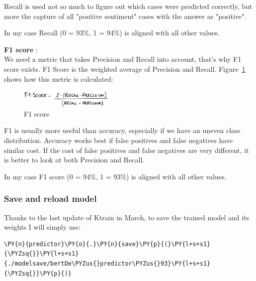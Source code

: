 Recall is used not so much to figure out which cases were predicted correctly, but more the capture of all "positive sentiment" cases with the answer as "positive".

In my case Recall (0 = 93\%, 1 = 94\%) is aligned with all other values.

\textbf{F1 score} \cite{brownlee_how_2020}:\\
We need a metric that takes Precision and Recall into account, that's why F1 score exists.
F1 Score is the weighted average of Precision and Recall.
Figure~\ref{fig:fig_f1} shows how this metric is calculated:
\begin{figure}[ht!]
\centering
\includegraphics[width=0.4\textwidth]{images/f1.png}
\caption{F1 score}
\label{fig:fig_f1}
\end{figure}
\FloatBarrier

F1 is usually more useful than accuracy, especially if we have an uneven class distribution. Accuracy works best if false positives and false negatives have similar cost. If the cost of false positives and false negatives are very different, it is better to look at both Precision and Recall.

In my case F1 score (0 = 94\%, 1 = 93\%) is aligned with all other values.


\subsubsection{Save and reload model}
Thanks to the last update of Ktrain in March, to save the trained model and its weights I will simply use:
    \begin{tcolorbox}[breakable, size=fbox, boxrule=1pt, pad at break*=1mm,colback=cellbackground, colframe=cellborder]
\begin{Verbatim}[commandchars=\\\{\},fontsize=\footnotesize]
\PY{n}{predictor}\PY{o}{.}\PY{n}{save}\PY{p}{(}\PY{l+s+s1}{\PYZsq{}}\PY{l+s+s1}{./modelsave/bertDe\PYZus{}predictor\PYZus{}93}\PY{l+s+s1}{\PYZsq{}}\PY{p}{)}
\end{Verbatim}
\end{tcolorbox}

